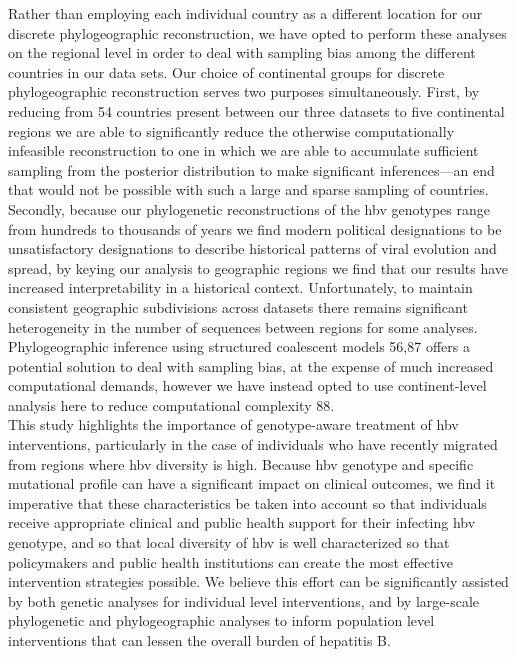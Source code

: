 Rather than employing each individual country as a different location for our discrete phylogeographic reconstruction, we have opted to perform these analyses on the regional level in order to deal with sampling bias among the different countries in our data sets.
Our choice of continental groups for discrete phylogeographic reconstruction serves two purposes simultaneously.
First, by reducing from 54 countries present between our three datasets to five continental regions we are able to significantly reduce the otherwise computationally infeasible reconstruction to one in which we are able to accumulate sufficient sampling from the posterior distribution to make significant inferences---an end that would not be possible with such a large and sparse sampling of countries.
Secondly, because our phylogenetic reconstructions of the \gls{hbv} genotypes range from hundreds to thousands of years we find modern political designations to be unsatisfactory designations to describe historical patterns of viral evolution and spread, by keying our analysis to geographic regions we find that our results have increased interpretability in a historical context.
Unfortunately, to maintain consistent geographic subdivisions across datasets there remains significant heterogeneity in the number of sequences between regions for some analyses.
Phylogeographic inference using structured coalescent models 56,87 offers a potential solution to deal with sampling bias, at the expense of much increased computational demands, however we have instead opted to use continent-level analysis here to reduce computational complexity 88.\\

This study highlights the importance of genotype-aware treatment of \gls{hbv} interventions, particularly in the case of individuals who have recently migrated from regions where \gls{hbv} diversity is high.
Because \gls{hbv} genotype and specific mutational profile can have a significant impact on clinical outcomes, we find it imperative that these characteristics be taken into account so that individuals receive appropriate clinical and public health support for their infecting \gls{hbv} genotype, and so that local diversity of \gls{hbv} is well characterized so that policymakers and public health institutions can create the most effective intervention strategies possible.
We believe this effort can be significantly assisted by both genetic analyses for individual level interventions, and by large-scale phylogenetic and phylogeographic analyses to inform population level interventions that can lessen the overall burden of hepatitis B.


